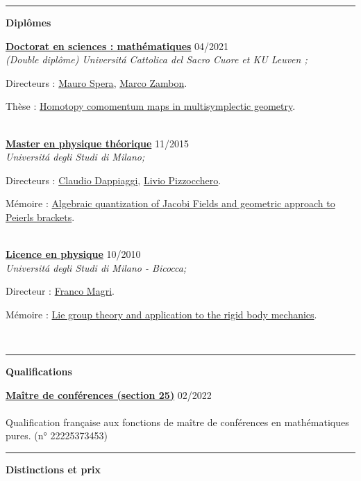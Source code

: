\documentclass[a4paper]{article}
\newcommand{\block}[1]{\hrule \vspace{0.2cm} \textbf{\Large #1} \vspace{0.2cm}}
\newcommand{\voice}[5]{\href{#4}{\textbf{#1}} \hfill #2 \\ \textit{#3} \\ {\small #5} \vspace{0.2cm} \\}
\begin{document}
	\block{Diplômes}

	\voice{Doctorat en sciences : mathématiques}
		{04/2021}
		{(Double diplôme) Universit\'a Cattolica del Sacro Cuore et KU Leuven ;}
		{https://web.archive.org/save/http://scuoledidottorato.unicatt.it/phdschools/science-research-projects}
		{Directeurs : \href{http://docenti.unicatt.it/ita/mauro_spera/}{Mauro Spera}, \href{https://perswww.kuleuven.be/~u0096206/}{Marco Zambon}. \par Thèse : \href{https://limo.libis.be/primo-explore/fulldisplay?docid=LIRIAS3408626&context=L&vid=KULeuven&search_scope=ALL_CONTENT&tab=all_content_tab&lang=en_US}{Homotopy comomentum maps in multisymplectic geometry}.}
	\voice{Master en physique théorique}
		{11/2015}
		{Universit\'a degli Studi di Milano;}
		{https://fisica-lm.cdl.unimi.it/it}
		{Directeurs : \href{http://fisica.unipv.it/personale/Persona.php?ID=256}{Claudio Dappiaggi}, \href{http://users.mat.unimi.it/users/pizzocchero/}{Livio Pizzocchero}. \par Mémoire : \href{https://www.researchgate.net/publication/295548746_Algebraic_quantization_of_Jacobi_fields_and_geometric_approach_to_Peierls_brackets}{Algebraic quantization of Jacobi Fields and geometric approach to Peierls brackets}.}
	\voice{Licence en physique}
		{10/2010}
		{Universit\'a degli Studi di Milano - Bicocca;}
		{https://www.fisica.unimib.it/en}
		{Directeur : \href{http://staff.matapp.unimib.it/~/magri/}{Franco Magri}. \par Mémoire : \href{https://github.com/MasterToninus/TesiTriennale/blob/master/tesi.pdf}{Lie group theory and application to the rigid body mechanics}.}

	\block{Qualifications}

	\voice{Maître de conférences (section 25)}
		{02/2022}
		{\vspace{-0.5cm}}
		{https://www.galaxie.enseignementsup-recherche.gouv.fr/ensup/qualification/Resultats_2022/qualifies_MCF_2022.pdf}
		{Qualification française aux fonctions de maître de conférences en mathématiques pures. (n° 22225373453)}

	\block{Distinctions et prix}
\end{document}
